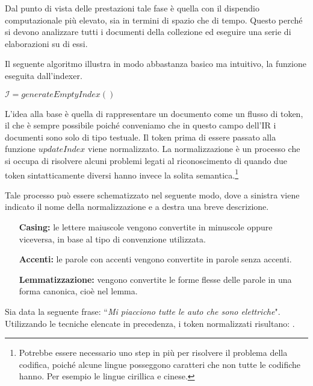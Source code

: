 Dal punto di vista delle prestazioni tale fase è quella con il  dispendio computazionale
più elevato, sia in termini di spazio che di tempo.
Questo perché si devono analizzare tutti i documenti della collezione ed eseguire una serie di elaborazioni
su di essi.

Il seguente algoritmo illustra in modo abbastanza basico ma intuitivo, la funzione eseguita dall'indexer.
\begin{algorithm}[h]
	\small
	\DontPrintSemicolon
	\BlankLine
	$\mathcal{I} = generateEmptyIndex()$\;
	\caption{\textsc{}}
	\label{alg:indexing}
\end{algorithm}
L'idea alla base è quella di rappresentare un documento come un flusso di token, il che è sempre possibile
poiché conveniamo che in questo campo dell'IR i documenti sono solo di tipo testuale.
Il token prima di essere passato alla funzione $updateIndex$ viene normalizzato. La normalizzazione è un processo
che si occupa di risolvere alcuni problemi legati al riconoscimento di  quando due token sintatticamente diversi
hanno invece la solita semantica.\footnote{Potrebbe essere necessario uno step in più per risolvere il problema della codifica, poiché alcune lingue posseggono caratteri che non tutte le codifiche hanno. Per esempio le lingue cirillica e cinese.}

Tale processo può essere schematizzato nel seguente modo, dove a sinistra viene indicato
il nome della normalizzazione e a destra una breve descrizione.

\begin{itemize}
	\item[\textbf{Casing:}] le lettere maiuscole vengono convertite in minuscole oppure viceversa, in base al tipo di convenzione utilizzata.
	\item[\textbf{Accenti:}] le parole con accenti vengono convertite in parole senza accenti.
	\item[\textbf{Lemmatizzazione:}] vengono convertite le forme flesse delle parole in una forma canonica, cioè nel lemma.
\end{itemize}

\begin{esempio}[normalizzazione]
	Sia data la seguente frase: ``\textit{Mi piacciono tutte le auto che sono elettriche}".
	Utilizzando le tecniche elencate in precedenza, i token normalizzati risultano:
	    
	  .
\end{esempio}

